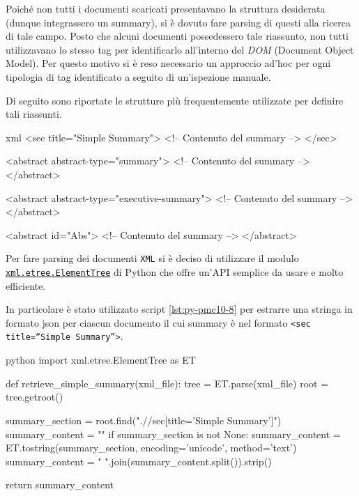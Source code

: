 \documentclass[12pt,a4paper,twoside,openright]{book}
\begin{document}
Poiché non tutti i documenti scaricati presentavano la struttura desiderata (dunque integrassero un summary), si è dovuto fare parsing di questi alla ricerca di tale campo. 
Posto che alcuni documenti possedessero tale riassunto, non tutti utilizzavano lo stesso tag per identificarlo all'interno del \emph{DOM} (Document Object Model). Per questo motivo si è reso necessario un approccio ad'hoc per ogni tipologia di tag identificato a seguito di un'ispezione manuale. 

Di seguito sono riportate le strutture più frequentemente utilizzate per definire tali riassunti.

\begin{customcode}
\begin{mintedbox}{xml}
<sec title="Simple Summary">
  <!-- Contenuto del summary -->
</sec>

<abstract abstract-type="summary">
  <!-- Contenuto del summary -->
</abstract>

<abstract abstract-type="executive-summary">
  <!-- Contenuto del summary -->
</abstract>

<abstract id="Abs">
  <!-- Contenuto del summary -->
</abstract>
\end{mintedbox}
\caption{Struttura XML di un summary.}
\label{lst:xml-pmc10-8}
\end{customcode}


Per fare parsing dei documenti \texttt{XML} si è deciso di utilizzare il modulo \href{https://docs.python.org/3/library/xml.html}{\texttt{xml.etree.ElementTree}} di Python che offre un'API semplice da usare e molto efficiente. 

In particolare è stato utilizzato script \ref{lst:py-pmc10-8} per estrarre una stringa in formato json per ciascun documento il cui summary è nel formato \texttt{<sec title=``Simple Summary''>}.

\begin{customcode}
\begin{mintedbox}{python}
import xml.etree.ElementTree as ET

def retrieve_simple_summary(xml_file):
    tree = ET.parse(xml_file)
    root = tree.getroot()

    summary_section = root.find(".//sec[title='Simple Summary']")
    summary_content = ""
    if summary_section is not None:
        summary_content = ET.tostring(summary_section, encoding='unicode', method='text')
        summary_content = " ".join(summary_content.split()).strip() 
    
    return summary_content
\end{mintedbox}
\caption{Script Python per parsing della sezione `Simple Summary'.}
\label{lst:py-pmc10-8}
\end{customcode}
\end{document}
